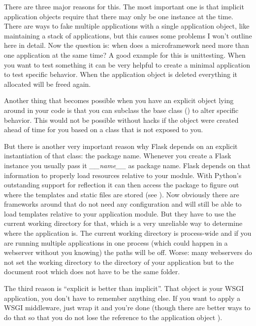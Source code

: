 \documentclass[a4paper,12pt]{sphinxmanual}
\begin{document}
There are three major reasons for this.  The most important one is that
implicit application objects require that there may only be one instance at
the time.  There are ways to fake multiple applications with a single
application object, like maintaining a stack of applications, but this
causes some problems I won't outline here in detail.  Now the question is:
when does a microframework need more than one application at the same
time?  A good example for this is unittesting.  When you want to test
something it can be very helpful to create a minimal application to test
specific behavior.  When the application object is deleted everything it
allocated will be freed again.

Another thing that becomes possible when you have an explicit object lying
around in your code is that you can subclass the base class
({\hyperref[api:flask.Flask]{}}) to alter specific behavior.  This would not be
possible without hacks if the object were created ahead of time for you
based on a class that is not exposed to you.

But there is another very important reason why Flask depends on an
explicit instantiation of that class: the package name.  Whenever you
create a Flask instance you usually pass it \emph{\_\_name\_\_} as package name.
Flask depends on that information to properly load resources relative
to your module.  With Python's outstanding support for reflection it can
then access the package to figure out where the templates and static files
are stored (see {\hyperref[api:flask.Flask.open_resource]{}}).  Now obviously there
are frameworks around that do not need any configuration and will still be
able to load templates relative to your application module.  But they have
to use the current working directory for that, which is a very unreliable
way to determine where the application is.  The current working directory
is process-wide and if you are running multiple applications in one
process (which could happen in a webserver without you knowing) the paths
will be off.  Worse: many webservers do not set the working directory to
the directory of your application but to the document root which does not
have to be the same folder.

The third reason is ``explicit is better than implicit''.  That object is
your WSGI application, you don't have to remember anything else.  If you
want to apply a WSGI middleware, just wrap it and you're done (though
there are better ways to do that so that you do not lose the reference
to the application object {\hyperref[api:flask.Flask.wsgi_app]{}}).
\end{document}
